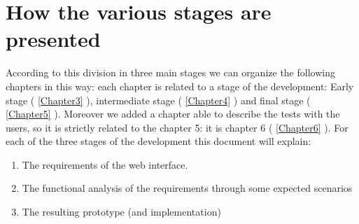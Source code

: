 \section{How the various stages are presented}
According to this division in three main stages we can organize the following chapters in this way:
each chapter is related to a stage of the development: Early stage (  \ref{Chapter3} ), intermediate stage ( \ref{Chapter4} ) and final stage ( \ref{Chapter5} ). Moreover we added a chapter able to describe the tests with the users, so it is strictly related to the chapter 5: it is chapter 6 ( \ref{Chapter6} ).
For each of the three stages of the development this document will explain:

\begin {enumerate}

\item
The requirements of the web interface.

\item
The functional analysis of the requirements through some expected scenarios

\item
The resulting prototype (and implementation)  

\end {enumerate} 



 
